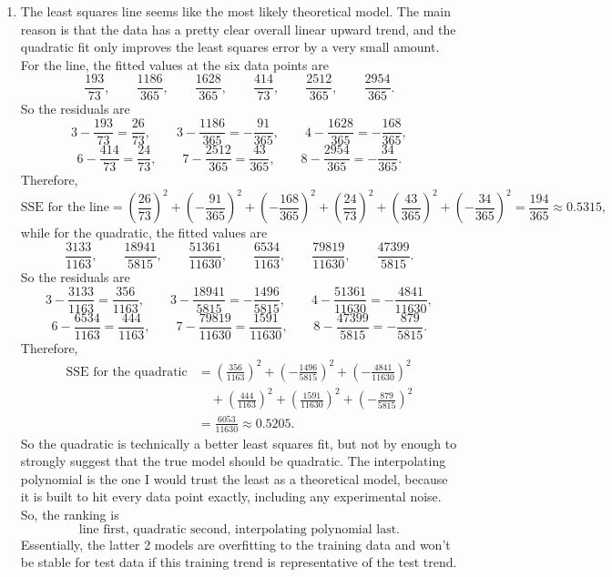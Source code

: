 \documentclass[10pt]{extarticle}
\begin{document}
\begin{enumerate}[label=(\alph*)]
\item The least squares line seems like the most likely theoretical model. The main reason is that the data has a pretty clear overall linear upward trend, and the quadratic fit only improves the least squares error by a very small amount. For the line, the fitted values at the six data points are
\[
\frac{193}{73},\qquad
\frac{1186}{365},\qquad
\frac{1628}{365},\qquad
\frac{414}{73},\qquad
\frac{2512}{365},\qquad
\frac{2954}{365}.
\]
So the residuals are
\[
3-\frac{193}{73}=\frac{26}{73},\qquad
3-\frac{1186}{365}=-\frac{91}{365},\qquad
4-\frac{1628}{365}=-\frac{168}{365},
\]
\[
6-\frac{414}{73}=\frac{24}{73},\qquad
7-\frac{2512}{365}=\frac{43}{365},\qquad
8-\frac{2954}{365}=-\frac{34}{365}.
\]
Therefore,
\[
\text{SSE for the line}
=\left(\frac{26}{73}\right)^2
+\left(-\frac{91}{365}\right)^2
+\left(-\frac{168}{365}\right)^2
+\left(\frac{24}{73}\right)^2
+\left(\frac{43}{365}\right)^2
+\left(-\frac{34}{365}\right)^2
=\frac{194}{365}\approx 0.5315,
\]
while for the quadratic, the fitted values are
\[
\frac{3133}{1163},\qquad
\frac{18941}{5815},\qquad
\frac{51361}{11630},\qquad
\frac{6534}{1163},\qquad
\frac{79819}{11630},\qquad
\frac{47399}{5815}.
\]
So the residuals are
\[
3-\frac{3133}{1163}=\frac{356}{1163},\qquad
3-\frac{18941}{5815}=-\frac{1496}{5815},\qquad
4-\frac{51361}{11630}=-\frac{4841}{11630},
\]
\[
6-\frac{6534}{1163}=\frac{444}{1163},\qquad
7-\frac{79819}{11630}=\frac{1591}{11630},\qquad
8-\frac{47399}{5815}=-\frac{879}{5815}.
\]
Therefore,
\[
\begin{aligned}
\text{SSE for the quadratic}
&=\left(\frac{356}{1163}\right)^2
+\left(-\frac{1496}{5815}\right)^2
+\left(-\frac{4841}{11630}\right)^2\\
&\quad
+\left(\frac{444}{1163}\right)^2
+\left(\frac{1591}{11630}\right)^2
+\left(-\frac{879}{5815}\right)^2\\
&=\frac{6053}{11630}\approx 0.5205.
\end{aligned}
\]
So the quadratic is technically a better least squares fit, but not by enough to strongly suggest that the true model should be quadratic. The interpolating polynomial is the one I would trust the least as a theoretical model, because it is built to hit every data point exactly, including any experimental noise. So, the ranking is
\[
\text{line first, quadratic second, interpolating polynomial last.}
\]
Essentially, the latter 2 models are overfitting to the training data and won't be stable for test data if this training trend is representative of the test trend.
\end{enumerate}
\end{document}
